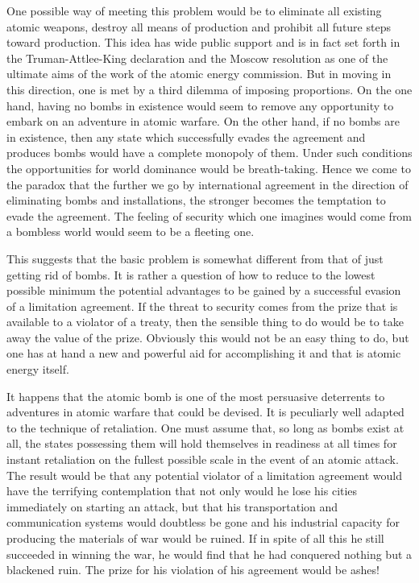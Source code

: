 \begin{introduction}
One possible way of meeting this problem would be to eliminate all existing atomic weapons, destroy all means of production and prohibit all future steps toward production. This idea has wide public support and is in fact set forth in the Truman-Attlee-King declaration and the Moscow resolution as one of the ultimate aims of the work of the atomic energy commission. But in moving in this direction, one is met by a third dilemma of imposing proportions. On the one hand, having no bombs in existence would seem to remove any opportunity to embark on an adventure in atomic warfare. On the other hand, if no bombs are in existence, then any state which successfully evades the agreement and produces bombs would have a complete monopoly of them. Under such conditions the opportunities for world dominance would be breath-taking. Hence we come to the paradox that the further we go by international agreement in the direction of eliminating bombs and installations, the stronger becomes the temptation to evade the agreement. The feeling of security which one imagines would come from a bombless world would seem to be a fleeting one.

This suggests that the basic problem is somewhat different from that of just getting rid of bombs. It is rather a question of how to reduce to the lowest possible minimum the potential advantages to be gained by a successful evasion of a limitation agreement. If the threat to security comes from the prize that is available to a violator of a treaty, then the sensible thing to do would be to take away the value of the prize. Obviously this would not be an easy thing to do, but one has at hand a new and powerful aid for accomplishing it and that is atomic energy itself.

It happens that the atomic bomb is one of the most persuasive deterrents to adventures in atomic warfare that could be devised. It is peculiarly well adapted to the technique of retaliation. One must assume that, so long as bombs exist at all, the states possessing them will hold themselves in readiness at all times for instant retaliation on the fullest possible scale in the event of an atomic attack. The result would be that any potential violator of a limitation agreement would have the terrifying contemplation that not only would he lose his cities immediately on starting an attack, but that his transportation and communication systems would doubtless be gone and his industrial capacity for producing the materials of war would be ruined. If in spite of all this he still succeeded in winning the war, he would find that he had conquered nothing but a blackened ruin. The prize for his violation of his agreement would be ashes!


\end{introduction}
